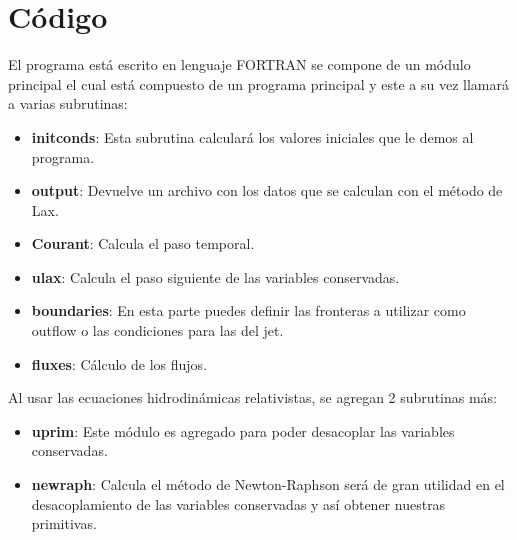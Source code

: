 \documentclass[12pt,a4paper]{book}
\begin{document}
\chapter{Código}\label{aped.A}
El programa está escrito en lenguaje FORTRAN se compone de un módulo principal el cual está compuesto de un programa principal y este a su vez llamará a varias subrutinas:
\begin{itemize}
\item \textbf{initconds}: Esta subrutina calculará los valores iniciales que le demos al programa.

\item \textbf{output}: Devuelve un archivo con los datos que se calculan con el método de Lax.

\item \textbf{Courant}: Calcula el paso temporal.

\item \textbf{ulax}: Calcula el paso siguiente de las variables conservadas.

\item \textbf{boundaries}: En esta parte puedes definir las fronteras a utilizar como outflow o las condiciones para las del jet.

\item \textbf{fluxes}: Cálculo de los flujos.
\end{itemize}

Al usar las ecuaciones hidrodinámicas relativistas, se agregan 2 subrutinas más:

\begin{itemize}
\item \textbf{uprim}: Este módulo es agregado para poder desacoplar las variables conservadas.

\item \textbf{newraph}: Calcula el método de Newton-Raphson será de gran utilidad en el desacoplamiento de las variables conservadas y así obtener nuestras primitivas.
\end{itemize}
\end{document}
